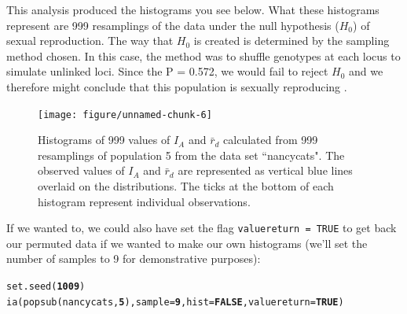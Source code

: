 \documentclass[letterpaper]{article}\usepackage[]{graphicx}\usepackage[]{color}
\makeatletter
\newcommand{\hlnum}[1]{\textcolor[rgb]{0.502,0,0.502}{\textbf{#1}}}%
\newcommand{\hlstd}[1]{\textcolor[rgb]{0,0,0}{#1}}%
\newcommand{\hlkwc}[1]{\textcolor[rgb]{0,0.502,0.753}{#1}}%
\newcommand{\hlkwd}[1]{\textcolor[rgb]{0,0.267,0.4}{#1}}%
\newenvironment{kframe}{%
 \def\at@end@of@kframe{}%
 \ifinner\ifhmode%
  \def\at@end@of@kframe{\end{minipage}}%
  \begin{minipage}{\columnwidth}%
 \fi\fi%
 \def\FrameCommand##1{\hskip\@totalleftmargin \hskip-\fboxsep
 \colorbox{shadecolor}{##1}\hskip-\fboxsep
     \hskip-\linewidth \hskip-\@totalleftmargin \hskip\columnwidth}%
 \MakeFramed {\advance\hsize-\width
   \@totalleftmargin\z@ \linewidth\hsize
   \@setminipage}}%
 {\par\unskip\endMakeFramed%
 \at@end@of@kframe}
\newenvironment{knitrout}{}{} %
\makeatother
\begin{document}
This analysis produced the histograms you see below. What these histograms represent are 999 resamplings of the data under the null hypothesis ($H_0$) of sexual reproduction. The way that $H_0$ is created is determined by the sampling method chosen. In this case, the method was to shuffle genotypes at each locus to simulate unlinked loci. Since the P = 0.572, we would fail to reject $H_0$ and we therefore might conclude that this population is sexually reproducing \cite{Brown:1980} \cite{Smith:1993} \cite{Agapow:2001}.
\begin{figure}[h!]
  \centering
  \caption{\footnotesize Histograms of 999 values of $I_A$ and $\bar{r}_d$ calculated from 999 resamplings of population 5 from the data set ``nancycats". The observed values of $I_A$ and $\bar r_d$ are represented as vertical blue lines overlaid on the distributions. The ticks at the bottom of each histogram represent individual observations.}
  \label{ia_demo_fig}
\begin{knitrout}\footnotesize
{}\color{fgcolor}

{\centering \texttt{[image: figure/unnamed-chunk-6]} 

}



\end{knitrout}

\end{figure}

If we wanted to, we could also have set the flag \texttt{valuereturn = TRUE} to 
get back our permuted data if we wanted to make our own histograms (we'll set 
the number of samples to 9 for demonstrative purposes):

\begin{knitrout}\footnotesize
{}\color{fgcolor}\begin{kframe}
\begin{alltt}
\hlkwd{set.seed}\hlstd{(}\hlnum{1009}\hlstd{)}
\hlkwd{ia}\hlstd{(}\hlkwd{popsub}\hlstd{(nancycats,} \hlnum{5}\hlstd{),} \hlkwc{sample} \hlstd{=} \hlnum{9}\hlstd{,} \hlkwc{hist} \hlstd{=} \hlnum{FALSE}\hlstd{,} \hlkwc{valuereturn} \hlstd{=} \hlnum{TRUE}\hlstd{)}
\end{alltt}
\end{kframe}
\end{knitrout}
\end{document}
